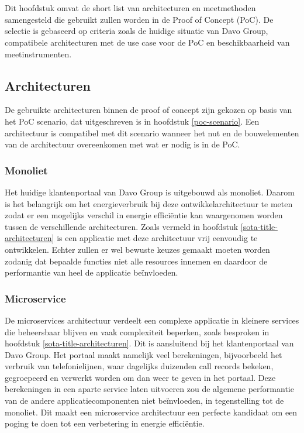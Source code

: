 

\chapter{}
\label{ch:short-list}
Dit hoofdstuk omvat de short list van architecturen en meetmethoden samengesteld die gebruikt zullen worden in de Proof of Concept (PoC). De selectie is gebaseerd op criteria zoals de huidige situatie van Davo Group, compatibele architecturen met de use case voor de PoC en beschikbaarheid van meetinstrumenten.

\section{Architecturen}
De gebruikte architecturen binnen de proof of concept zijn gekozen op basis van het PoC scenario, dat uitgeschreven is in hoofdstuk \ref{poc-scenario}. Een architectuur is compatibel met dit scenario wanneer het nut en de bouwelementen van de architectuur overeenkomen met wat er nodig is in de PoC.


\subsection{Monoliet}
Het huidige klantenportaal van Davo Group is uitgebouwd als monoliet. Daarom is het belangrijk om het energieverbruik bij deze ontwikkelarchitectuur te meten zodat er een mogelijks verschil in energie efficiëntie kan waargenomen worden tussen de verschillende architecturen. Zoals vermeld in hoofdstuk \ref{sota-title-architecturen} is een applicatie met deze architectuur vrij eenvoudig te ontwikkelen. Echter zullen er wel bewuste keuzes gemaakt moeten worden zodanig dat bepaalde functies niet alle resources innemen en daardoor de performantie van heel de applicatie beïnvloeden.


\subsection{Microservice}
De microservices architectuur verdeelt een complexe applicatie in kleinere services die beheersbaar blijven en vaak complexiteit beperken, zoals besproken in hoofdstuk \ref{sota-title-architecturen}. Dit is aansluitend bij het klantenportaal van Davo Group. Het portaal maakt namelijk veel berekeningen, bijvoorbeeld het verbruik van telefonielijnen, waar dagelijks duizenden call records bekeken, gegroepeerd en verwerkt worden om dan weer te geven in het portaal. Deze berekeningen in een aparte service laten uitvoeren zou de algemene performantie van de andere applicatiecomponenten niet beïnvloeden, in tegenstelling tot de monoliet. Dit maakt een microservice architectuur een perfecte kandidaat om een poging te doen tot een verbetering in energie efficiëntie.


